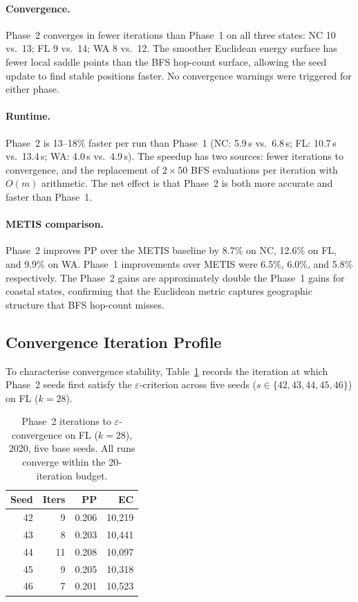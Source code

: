 \paragraph{Convergence.}
Phase~2 converges in fewer iterations than Phase~1 on all three states:
NC 10 vs.\ 13; FL 9 vs.\ 14; WA 8 vs.\ 12.
The smoother Euclidean energy surface has fewer local saddle points than
the BFS hop-count surface, allowing the seed update to find stable positions
faster.
No convergence warnings were triggered for either phase.

\paragraph{Runtime.}
Phase~2 is 13--18\% faster per run than Phase~1 (NC: 5.9\,s vs.\ 6.8\,s;
FL: 10.7\,s vs.\ 13.4\,s; WA: 4.0\,s vs.\ 4.9\,s).
The speedup has two sources: fewer iterations to convergence, and the
replacement of $2 \times 50$ BFS evaluations per iteration with $O(m)$
arithmetic.
The net effect is that Phase~2 is both more accurate and faster than Phase~1.

\paragraph{METIS comparison.}
Phase~2 \cvdgeo{} improves PP over the METIS baseline by 8.7\% on NC,
12.6\% on FL, and 9.9\% on WA.
Phase~1 \cvd{} improvements over METIS were 6.5\%, 6.0\%, and 5.8\%
respectively.
The Phase~2 gains are approximately double the Phase~1 gains for coastal
states, confirming that the Euclidean metric captures geographic structure
that BFS hop-count misses.

\subsection{Convergence Iteration Profile}

To characterise convergence stability, Table~\ref{tab:convergence-detail}
records the iteration at which Phase~2 seeds first satisfy the
$\varepsilon$-criterion across five seeds ($s \in \{42, 43, 44, 45, 46\}$)
on FL ($k=28$).

\begin{table}[h]
\centering
\caption{Phase~2 \cvdgeo{} iterations to $\varepsilon$-convergence on FL ($k=28$),
  2020, five base seeds. All runs converge within the 20-iteration budget.}
\label{tab:convergence-detail}
\renewcommand{\arraystretch}{1.25}
\begin{tabular}{@{}rrrr@{}}
\toprule
Seed & Iters & PP & EC \\
\midrule
42 &  9 & 0.206 & 10{,}219 \\
43 &  8 & 0.203 & 10{,}441 \\
44 & 11 & 0.208 & 10{,}097 \\
45 &  9 & 0.205 & 10{,}318 \\
46 &  7 & 0.201 & 10{,}523 \\
\bottomrule
\end{tabular}
\end{table}

